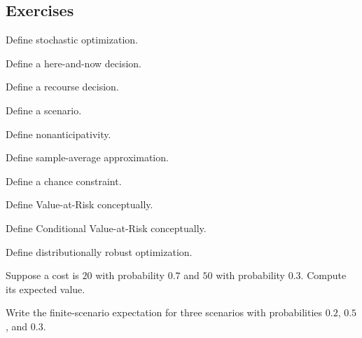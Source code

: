 \subsection{Exercises}
\label{subsec:stochastic-optimization-exercises}

\begin{exercise}[1]
Define stochastic optimization.
\end{exercise}

\begin{exercise}[1]
Define a here-and-now decision.
\end{exercise}

\begin{exercise}[1]
Define a recourse decision.
\end{exercise}

\begin{exercise}[1]
Define a scenario.
\end{exercise}

\begin{exercise}[1]
Define nonanticipativity.
\end{exercise}

\begin{exercise}[1]
Define sample-average approximation.
\end{exercise}

\begin{exercise}[1]
Define a chance constraint.
\end{exercise}

\begin{exercise}[1]
Define Value-at-Risk conceptually.
\end{exercise}

\begin{exercise}[1]
Define Conditional Value-at-Risk conceptually.
\end{exercise}

\begin{exercise}[1]
Define distributionally robust optimization.
\end{exercise}

\begin{exercise}[2]
Suppose a cost is \(20\) with probability \(0.7\) and \(50\) with
probability \(0.3\). Compute its expected value.
\end{exercise}

\begin{exercise}[2]
Write the finite-scenario expectation for three scenarios with
probabilities \(0.2\), \(0.5\), and \(0.3\).
\end{exercise}

